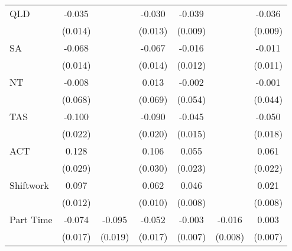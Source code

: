 {\begin{tabular}{l*{6}{c}}
QLD                 &      -0.035\sym{**} &                     &      -0.030\sym{**} &      -0.039\sym{***}&                     &      -0.036\sym{***}\\
                    &     (0.014)         &                     &     (0.013)         &     (0.009)         &                     &     (0.009)         \\
SA                  &      -0.068\sym{***}&                     &      -0.067\sym{***}&      -0.016         &                     &      -0.011         \\
                    &     (0.014)         &                     &     (0.014)         &     (0.012)         &                     &     (0.011)         \\
NT                  &      -0.008         &                     &       0.013         &      -0.002         &                     &      -0.001         \\
                    &     (0.068)         &                     &     (0.069)         &     (0.054)         &                     &     (0.044)         \\
TAS                 &      -0.100\sym{***}&                     &      -0.090\sym{***}&      -0.045\sym{***}&                     &      -0.050\sym{***}\\
                    &     (0.022)         &                     &     (0.020)         &     (0.015)         &                     &     (0.018)         \\
ACT                 &       0.128\sym{***}&                     &       0.106\sym{***}&       0.055\sym{**} &                     &       0.061\sym{***}\\
                    &     (0.029)         &                     &     (0.030)         &     (0.023)         &                     &     (0.022)         \\
Shiftwork           &       0.097\sym{***}&                     &       0.062\sym{***}&       0.046\sym{***}&                     &       0.021\sym{***}\\
                    &     (0.012)         &                     &     (0.010)         &     (0.008)         &                     &     (0.008)         \\
Part Time           &      -0.074\sym{***}&      -0.095\sym{***}&      -0.052\sym{***}&      -0.003         &      -0.016\sym{**} &       0.003         \\
                    &     (0.017)         &     (0.019)         &     (0.017)         &     (0.007)         &     (0.008)         &     (0.007)         \\

\end{tabular}}
